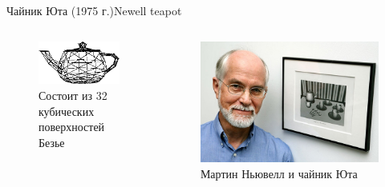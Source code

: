 \documentclass{beamer}
\begin{document}
\begin{frame}{Чайник Юта (1975 г.)}{Newell teapot}
	\begin{columns}
		\begin{column}{0.5\textwidth}
			\begin{figure} 
				\includegraphics[width=\textwidth]{images/Utah_teapot_model.png}
				\caption {Состоит из 32 кубических поверхностей Безье}
			\end{figure}
		\end{column}
		\begin{column}{0.5\textwidth}
			\begin{figure} 
				\includegraphics[width=\textwidth]{images/Utah_teapot_and_Newell.png}
				\caption {Мартин Ньювелл и чайник Юта}
			\end{figure}
		\end{column}
	\end{columns}


\end{frame}
\end{document}
